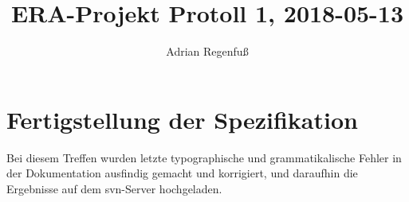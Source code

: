 \documentclass{article}
\title{ERA-Projekt Protoll 1, 2018-05-13}
\author{Adrian Regenfuß}
\begin{document}
\maketitle

\section{Fertigstellung der Spezifikation}

Bei diesem Treffen wurden letzte typographische und
grammatikalische Fehler in der Dokumentation ausfindig
gemacht und korrigiert, und daraufhin die Ergebnisse
auf dem svn-Server hochgeladen.
\end{document}
